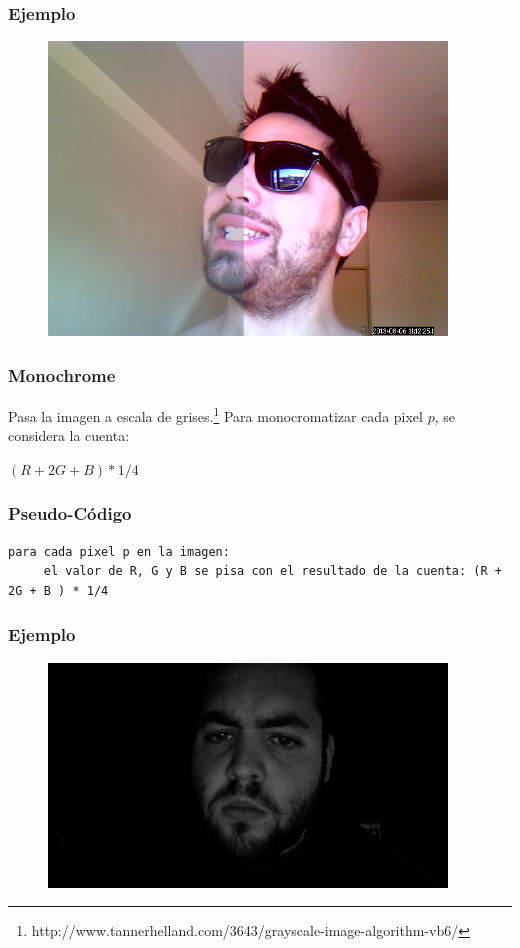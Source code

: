 \subsubsection*{Ejemplo}
\begin{center}
  \begin{figure}[H]
  \includegraphics[scale=0.60]{imgs/insta.png}
  \end{figure}  
\end{center}

\subsubsection{Monochrome}

Pasa la imagen a escala de grises.\footnote{http://www.tannerhelland.com/3643/grayscale-image-algorithm-vb6/} Para monocromatizar cada pixel $p$, se considera la cuenta:
\begin{center}
$ (R + 2G + B ) * 1/4 $
\end{center}
\subsubsection*{Pseudo-C\'odigo}
\begin{verbatim}
para cada pixel p en la imagen:
     el valor de R, G y B se pisa con el resultado de la cuenta: (R + 2G + B ) * 1/4
\end{verbatim}

\subsubsection*{Ejemplo}
\begin{center}
  \begin{figure}[H]
  \includegraphics[scale=0.60]{imgs/mono.png}
  \end{figure}  
\end{center}  

